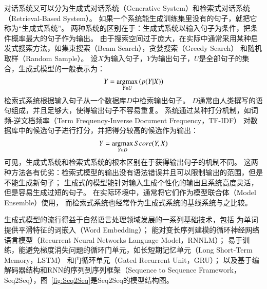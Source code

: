 对话系统又可以分为生成式对话系统（Generative System）和检索式对话系统（Retrieval-Based System）。
如果一个系统能生成训练集里没有的句子，就把它称为“生成式系统”。
两种系统的区别在于：生成式系统以输入句子为条件，把条件概率最大的句子作为输出。
由于搜索空间过于庞大，在实际中通常采用某种启发式搜索方法，如集束搜索（Beam Search），贪婪搜索（Greedy Search）
和随机取样（Random Sample）。
设$X$为输入句子，$Y$为输出句子，$U$是全部句子的集合，生成式模型的一般表示为：
\begin{align}
    Y = \operatorname*{argmax}_{Y\in U} \left(p(Y|X)\right)
\end{align}
检索式系统根据输入句子从一个数据库$D$中检索输出句子。
$D$通常由人类撰写的语句组成，并且足够大，使得输出句子不容易重复。
系统通过某种打分机制，如词频-逆文档频率（Term Frequency-Inverse Document Frequency，TF-IDF）
对数据库中的候选句子进行打分，并把得分较高的候选作为输出：
\begin{align}
    Y = \operatorname*{argmax}_{Y\in D} Score(Y, X)
\end{align}
可见，生成式系统和检索式系统的根本区别在于获得输出句子的机制不同。
这两种方法各有优劣：检索式模型的输出没有语法错误并且可以限制输出的范围，但是不能生成新句子；
生成式的模型能针对输入生成个性化的输出且系统高度灵活，但是容易生成过短的句子。
在实际环境中，通常将它们作为模型联合体（Model Ensemble）使用，
而检索式系统也经常作为生成式系统的基线系统与之比较。

生成式模型的流行得益于自然语言处理领域发展的一系列基础技术，包括
为单词提供平滑特征的词嵌入（Word Embedding）；
能对变长序列建模的循环神经网络语言模型（Recurrent Neural Networks Language Model，RNNLM）；
易于训练，能避免梯度消失问题的循环门单元，如长短期记忆单元（Long Short-Term Memory，LSTM）
和门循环单元（Gated Recurrent Unit，GRU）；
以及基于编解码器结构和RNN的序列到序列框架（Sequence to Sequence Framework，Seq2Seq），图~\ref{fig:Seq2Seq}是Seq2Seq的模型结构图。

